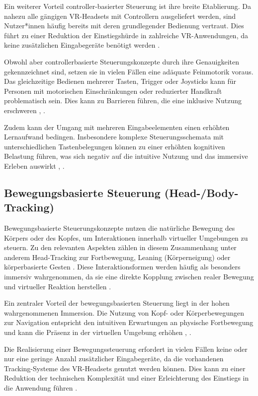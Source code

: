 Ein weiterer Vorteil controller-basierter Steuerung ist ihre breite Etablierung. Da nahezu alle gängigen VR-Headsets mit Controllern ausgeliefert werden, sind Nutzer*innen häufig bereits mit deren grundlegender Bedienung vertraut. Dies führt zu einer Reduktion der Einstiegshürde in zahlreiche VR-Anwendungen, da keine zusätzlichen Eingabegeräte benötigt werden \cite{Jason2015}.

Obwohl aber controllerbasierte Steuerungskonzepte durch ihre Genauigkeiten gekennzeichnet sind, setzen sie in vielen Fällen eine adäquate Feinmotorik voraus. Das gleichzeitige Bedienen mehrerer Tasten, Trigger oder Joysticks kann für Personen mit motorischen Einschränkungen oder reduzierter Handkraft problematisch sein. Dies kann zu Barrieren führen, die eine inklusive Nutzung erschweren \cite{Clarkson2003}, \cite{ISO2025}.

Zudem kann der Umgang mit mehreren Eingabeelementen einen erhöhten Lernaufwand bedingen. Insbesondere komplexe Steuerungsschemata mit unterschiedlichen Tastenbelegungen können zu einer erhöhten kognitiven Belastung führen, was sich negativ auf die intuitive Nutzung und das immersive Erleben auswirkt \cite{Jason2015}, \cite{Norman2002}.

\subsection{Bewegungsbasierte Steuerung (Head-/Body-Tracking)}
Bewegungsbasierte Steuerungskonzepte nutzen die natürliche Bewegung des Körpers oder des Kopfes, um Interaktionen innerhalb virtueller Umgebungen zu steuern. Zu den relevanten Aspekten zählen in diesem Zusammenhang unter anderem Head-Tracking zur Fortbewegung, Leaning (Körperneigung) oder körperbasierte Gesten \cite{Jason2015}. Diese Interaktionsformen werden häufig als besonders immersiv wahrgenommen, da sie eine direkte Kopplung zwischen realer Bewegung und virtueller Reaktion herstellen \cite{Bowman2012}.

Ein zentraler Vorteil der bewegungsbasierten Steuerung liegt in der hohen wahrgenommenen Immersion. Die Nutzung von Kopf- oder Körperbewegungen zur Navigation entspricht den intuitiven Erwartungen an physische Fortbewegung und kann die Präsenz in der virtuellen Umgebung erhöhen \cite{Wilbur1997}, \cite{Bowman2012}.

Die Realisierung einer Bewegungssteuerung erfordert in vielen Fällen keine oder nur eine geringe Anzahl zusätzlicher Eingabegeräte, da die vorhandenen Tracking-Systeme des VR-Headsets genutzt werden können. Dies kann zu einer Reduktion der technischen Komplexität und einer Erleichterung des Einstiegs in die Anwendung führen \cite{Jason2015}.

